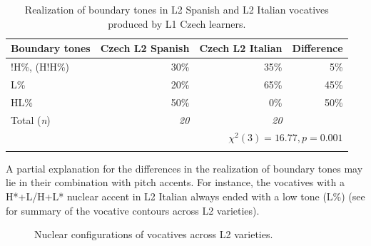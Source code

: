 \begin{table}
\begin{tabularx}{\textwidth}{Qrrr}

\lsptoprule

{Boundary tones} & {Czech L2 Spanish} & {Czech L2 Italian} & {Difference}\\
\midrule
!H\%, (H!H\%) &  30\% &  35\% &  5\%\\
L\% &  20\% &  65\% &  45\%\\
HL\% &  50\% &  0\% & 50\%\\
\midrule
Total (\textit{n}) & {\itshape 20} & {\itshape 20} &  \\
\\
\lspbottomrule
\end{tabularx}

\caption{Realization of boundary tones in L2 Spanish and L2 Italian vocatives produced by L1 Czech learners.}
\label{tab:4.38}
\end{table}

A partial explanation for the differences in the realization of boundary tones may lie in their combination with pitch accents. For instance, the vocatives with a H*+L/H+L* nuclear accent in L2 Italian always ended with a low tone (L\%) (see  for summary of the vocative contours across L2 varieties).

\begin{figure}



\caption{Nuclear configurations of vocatives across L2 varieties.}
\label{fig:4.142}
\end{figure}

